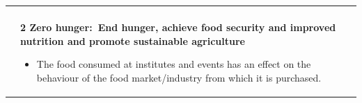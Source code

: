 \documentclass[../SustainableHEP.tex]{subfiles}
\begin{document}
\begin{longtable*}{l l}
{\begin{itemize}[leftmargin=20pt]
\end{itemize}}\\
\parbox[t]{\SDGleft\textwidth}{} & \parbox[t]{\SDGright\textwidth}{\textbf{2 Zero hunger:\ End hunger, achieve food security and improved nutrition and promote sustainable agriculture}
\begin{itemize}[leftmargin=20pt]
\item The food consumed at institutes and events has an effect on the behaviour of the food market/industry from which it is purchased.
\end{itemize}}\\


\end{longtable*}
\end{document}
